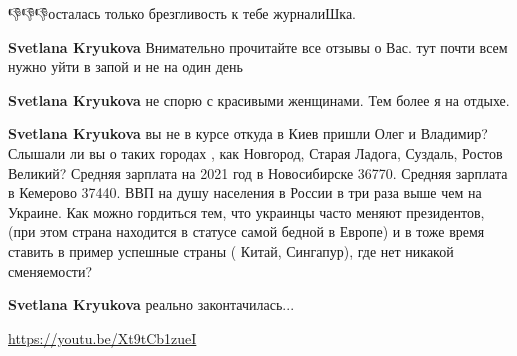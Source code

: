 \begin{itemize}
\begin{itemize}
👎👎👎осталась
только брезгливость к тебе журналиШка.

 
\textbf{Svetlana Kryukova} Внимательно прочитайте все отзывы о Вас. тут почти всем нужно уйти в запой и не на один день

 
\textbf{Svetlana Kryukova} не спорю с красивыми женщинами. Тем более я на отдыхе.

 
\textbf{Svetlana Kryukova} вы не в курсе откуда в Киев пришли Олег и Владимир? Слышали ли вы о таких городах , как Новгород, Старая Ладога, Суздаль, Ростов Великий? Средняя зарплата на 2021 год в Новосибирске 36770. Средняя зарплата в Кемерово 37440. ВВП на душу населения в России в три раза выше чем на Украине. Как можно гордиться тем, что украинцы часто меняют президентов, (при этом страна находится в статусе самой бедной в Европе) и в тоже время ставить в пример успешные страны ( Китай, Сингапур), где нет никакой сменяемости?

 
\textbf{Svetlana Kryukova} реально законтачилась...

 
\url{https://youtu.be/Xt9tCb1zueI}

 

\end{itemize}
\end{itemize}
